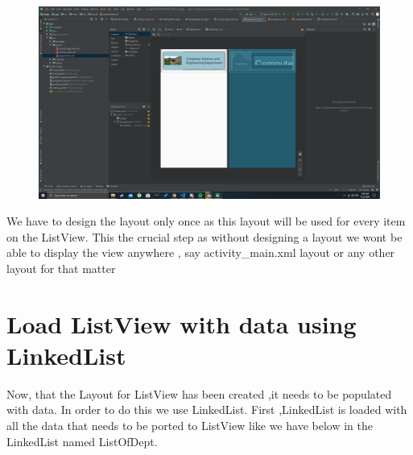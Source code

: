 \documentclass[11pt,a4paper]{report}
\begin{document}
\vspace{15pt}

\begin{figure}[H]
	\centering
		\includegraphics[scale=0.2]{./img/listview_2.png}
  \end{figure}

  \vspace{5pt}

We have to design the layout only once as this layout will be used for every item on the ListView.
This the crucial step as without designing a layout we wont be able to display the view 
anywhere , say activity\_main.xml layout or any other layout for that matter




\chapter{Load ListView with data using LinkedList}

Now, that the Layout for ListView has been created ,it needs to be populated with data.
In order to do this we use LinkedList.
First ,LinkedList is loaded with all the data that needs to be ported to ListView like we have
below in the LinkedList named ListOfDept.

\vspace{15pt}
\end{document}
